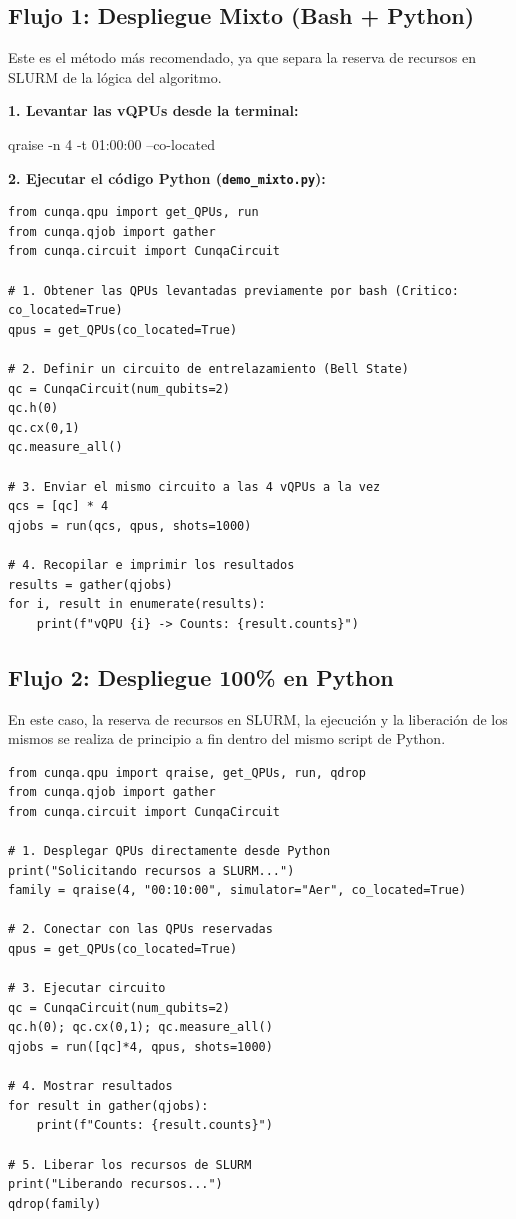 \documentclass[a4paper,11pt]{article}
\begin{document}
\subsection{Flujo 1: Despliegue Mixto (Bash + Python)}
Este es el método más recomendado, ya que separa la reserva de recursos en SLURM de la lógica del algoritmo.

\textbf{1. Levantar las vQPUs desde la terminal:}
\begin{terminal}
qraise -n 4 -t 01:00:00 --co-located
\end{terminal}

\textbf{2. Ejecutar el código Python (\texttt{demo\_mixto.py}):}
\begin{lstlisting}[style=pythonstyle, caption=demo\_mixto.py]
from cunqa.qpu import get_QPUs, run
from cunqa.qjob import gather
from cunqa.circuit import CunqaCircuit

# 1. Obtener las QPUs levantadas previamente por bash (Critico: co_located=True)
qpus = get_QPUs(co_located=True)

# 2. Definir un circuito de entrelazamiento (Bell State)
qc = CunqaCircuit(num_qubits=2)
qc.h(0)
qc.cx(0,1)
qc.measure_all()

# 3. Enviar el mismo circuito a las 4 vQPUs a la vez
qcs = [qc] * 4
qjobs = run(qcs, qpus, shots=1000)

# 4. Recopilar e imprimir los resultados
results = gather(qjobs)
for i, result in enumerate(results):
    print(f"vQPU {i} -> Counts: {result.counts}")
\end{lstlisting}

\subsection{Flujo 2: Despliegue 100\% en Python}
En este caso, la reserva de recursos en SLURM, la ejecución y la liberación de los mismos se realiza de principio a fin dentro del mismo script de Python.

\begin{lstlisting}[style=pythonstyle, caption=demo\_python.py]
from cunqa.qpu import qraise, get_QPUs, run, qdrop
from cunqa.qjob import gather
from cunqa.circuit import CunqaCircuit

# 1. Desplegar QPUs directamente desde Python
print("Solicitando recursos a SLURM...")
family = qraise(4, "00:10:00", simulator="Aer", co_located=True)

# 2. Conectar con las QPUs reservadas
qpus = get_QPUs(co_located=True)

# 3. Ejecutar circuito
qc = CunqaCircuit(num_qubits=2)
qc.h(0); qc.cx(0,1); qc.measure_all()
qjobs = run([qc]*4, qpus, shots=1000)

# 4. Mostrar resultados
for result in gather(qjobs):
    print(f"Counts: {result.counts}")

# 5. Liberar los recursos de SLURM
print("Liberando recursos...")
qdrop(family)
\end{lstlisting}
\end{document}
